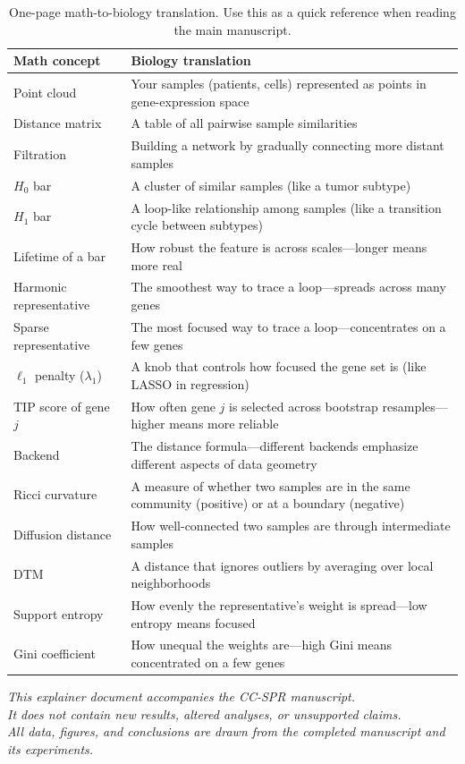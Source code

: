 \documentclass[11pt]{article}
\begin{document}
\begin{table}[h]
\centering
\small
\begin{tabular}{p{4cm}p{8cm}}
\toprule
\textbf{Math concept} & \textbf{Biology translation} \\
\midrule
Point cloud & Your samples (patients, cells) represented as points in gene-expression space \\
Distance matrix & A table of all pairwise sample similarities \\
Filtration & Building a network by gradually connecting more distant samples \\
$H_0$ bar & A cluster of similar samples (like a tumor subtype) \\
$H_1$ bar & A loop-like relationship among samples (like a transition cycle between subtypes) \\
Lifetime of a bar & How robust the feature is across scales---longer means more real \\
Harmonic representative & The smoothest way to trace a loop---spreads across many genes \\
Sparse representative & The most focused way to trace a loop---concentrates on a few genes \\
$\ell_1$ penalty ($\lambda_1$) & A knob that controls how focused the gene set is (like LASSO in regression) \\
TIP score of gene $j$ & How often gene $j$ is selected across bootstrap resamples---higher means more reliable \\
Backend & The distance formula---different backends emphasize different aspects of data geometry \\
Ricci curvature & A measure of whether two samples are in the same community (positive) or at a boundary (negative) \\
Diffusion distance & How well-connected two samples are through intermediate samples \\
DTM & A distance that ignores outliers by averaging over local neighborhoods \\
Support entropy & How evenly the representative's weight is spread---low entropy means focused \\
Gini coefficient & How unequal the weights are---high Gini means concentrated on a few genes \\
\bottomrule
\end{tabular}
\caption{One-page math-to-biology translation.
Use this as a quick reference when reading the main manuscript.}
\label{tab:cheatsheet}
\end{table}

\vfill
\begin{center}
\small\textit{This explainer document accompanies the CC-SPR manuscript.\\
It does not contain new results, altered analyses, or unsupported claims.\\
All data, figures, and conclusions are drawn from the completed manuscript and its experiments.}
\end{center}
\end{document}
